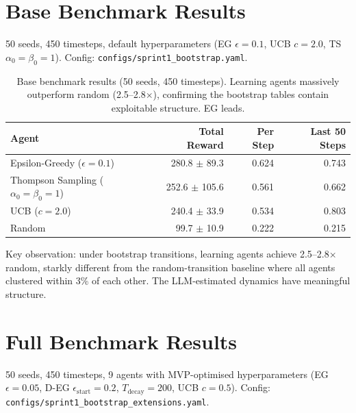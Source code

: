 \documentclass[11pt]{article}
\begin{document}
\section{Base Benchmark Results}

50 seeds, 450 timesteps, default hyperparameters (EG $\epsilon=0.1$, UCB $c=2.0$, TS $\alpha_0=\beta_0=1$). Config: \texttt{configs/sprint1\_bootstrap.yaml}.

\begin{table}[h]
\centering
\begin{tabular}{lrrr}
\toprule
Agent & Total Reward & Per Step & Last 50 Steps \\
\midrule
Epsilon-Greedy ($\epsilon=0.1$) & 280.8 $\pm$ 89.3 & 0.624 & 0.743 \\
Thompson Sampling ($\alpha_0=\beta_0=1$) & 252.6 $\pm$ 105.6 & 0.561 & 0.662 \\
UCB ($c=2.0$) & 240.4 $\pm$ 33.9 & 0.534 & 0.803 \\
Random & 99.7 $\pm$ 10.9 & 0.222 & 0.215 \\
\bottomrule
\end{tabular}
\caption{Base benchmark results (50 seeds, 450 timesteps). Learning agents massively outperform random (2.5--2.8$\times$), confirming the bootstrap tables contain exploitable structure. EG leads.}
\end{table}

Key observation: under bootstrap transitions, learning agents achieve 2.5--2.8$\times$ random, starkly different from the random-transition baseline where all agents clustered within 3\% of each other. The LLM-estimated dynamics have meaningful structure.

\section{Full Benchmark Results}

50 seeds, 450 timesteps, 9 agents with MVP-optimised hyperparameters (EG $\epsilon=0.05$, D-EG $\epsilon_{\text{start}}=0.2$, $T_{\text{decay}}=200$, UCB $c=0.5$). Config: \texttt{configs/sprint1\_bootstrap\_extensions.yaml}.
\end{document}

